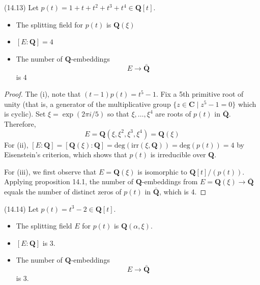 \vspace{2ex}
\begin{ex}
(14.13) Let $p(t)=1+t+t^2+t^3+t^{4}\in {\bm Q}[t]$. 
\begin{itemize}
\item[(i)] The splitting field for $p(t)$ is ${\bm Q}(\xi )$
\item[(ii)] $[E:{\bm Q}]=4$
\item[(iii)] The number of ${\bm Q}$-embeddings 
\[E\rightarrow \bar{{\bm Q}}\]
is 4
\end{itemize}
\end{ex}
\vspace{2ex}
\begin{proof}
The (i), note that $(t-1)p(t)=t^{5}-1$. Fix a 5th primitive root of unity (that is, a generator of the multiplicative group $\{z\in {\bm C}\;|\;z^{5}-1=0\}$ which is cyclic). Set $\xi=\exp (2\pi i/5)$ so that $\xi ,\ldots ,\xi ^{4}$ are roots of $p(t)$ in $\bar{{\bm Q}}$. Therefore,
\[E={\bm Q}(\xi ,\xi ^2,\xi ^3,\xi ^{4})={\bm Q}(\xi )\]
For (ii), $[E:{\bm Q}]=[{\bm Q}(\xi ):{\bm Q}]=\mathrm{deg}(\mathrm{irr}(\xi ,{\bm Q}))=\mathrm{deg}(p(t))=4$ by Eisenstein's criterion, which shows that $p(t)$ is irreducible over ${\bm Q}$.

\bigskip

For (iii), we first observe that $E={\bm Q}(\xi )$ is isomorphic to ${\bm Q}[t]/(p(t))$. Applying proposition 14.1, the number of ${\bm Q}$-embeddings from $E={\bm Q}(\xi )\rightarrow \bar{{\bm Q}}$ equals the number of distinct zeros of $p(t)$ in $\bar{{\bm Q}}$, which is 4. 
\end{proof}
\vspace{2ex}
\begin{ex}
(14.14) Let $p(t)=t^3-2\in {\bm Q}[t]$.
\begin{itemize}
\item[(i)] The splitting field $E$ for $p(t)$ is ${\bm Q}(\alpha ,\xi )$.
\item[(ii)] $[E:{\bm Q}]$ is 3.
\item[(iii)] The number of ${\bm Q}$-embeddings 
\[E\rightarrow \bar{{\bm Q}}\]
is 3.
\end{itemize}
\end{ex}
\vspace{2ex}
